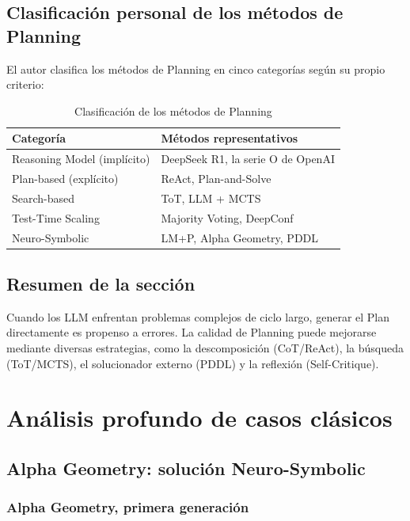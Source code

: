 \documentclass[a4paper]{article}
\begin{document}
\subsection{Clasificación personal de los métodos de Planning}

El autor clasifica los métodos de Planning en cinco categorías según su propio criterio:

\begin{table}[H]
\centering
\begin{tabular}{ll}
\toprule
\textbf{Categoría} & \textbf{Métodos representativos} \\
\midrule
Reasoning Model (implícito) & DeepSeek R1, la serie O de OpenAI \\
Plan-based (explícito) & ReAct, Plan-and-Solve \\
Search-based & ToT, LLM + MCTS \\
Test-Time Scaling & Majority Voting, DeepConf \\
Neuro-Symbolic & LM+P, Alpha Geometry, PDDL \\
\bottomrule
\end{tabular}
\caption{Clasificación de los métodos de Planning}
\end{table}

\subsection{Resumen de la sección}

Cuando los LLM enfrentan problemas complejos de ciclo largo, generar el Plan directamente es propenso a errores. La calidad de Planning puede mejorarse mediante diversas estrategias, como la descomposición (CoT/ReAct), la búsqueda (ToT/MCTS), el solucionador externo (PDDL) y la reflexión (Self-Critique).

\section{Análisis profundo de casos clásicos}

\subsection{Alpha Geometry: solución Neuro-Symbolic}

\subsubsection{Alpha Geometry, primera generación}
\end{document}
